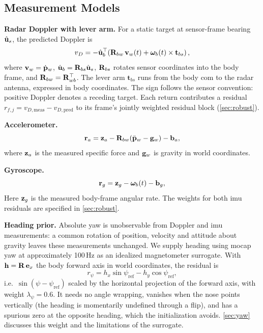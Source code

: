 \subsection{Measurement Models}
\label{sec:models}

\textbf{Radar Doppler with lever arm.}
For a static target at sensor-frame bearing $\hat{\mathbf{u}}_s$, the predicted
Doppler is
\begin{equation}
  v_D = -\hat{\mathbf{u}}_b^{\top}\!\left(
    \mathbf{R}_{bw}\,\mathbf{v}_w(t) + \boldsymbol{\omega}_b(t) \times \mathbf{t}_{bs}
  \right),
  \label{eq:doppler}
\end{equation}
where $\mathbf{v}_w=\dot{\mathbf{p}}_w$, $\hat{\mathbf{u}}_b=\mathbf{R}_{bs}\hat{\mathbf{u}}_s$,
$\mathbf{R}_{bs}$ rotates sensor coordinates into the body frame, and
$\mathbf{R}_{bw}=\mathbf{R}_{wb}^{\top}$.  The lever arm $\mathbf{t}_{bs}$ runs
from the body \ac{com} to the radar antenna, expressed in body coordinates.
The sign follows the sensor convention: positive Doppler denotes a
receding target.  Each return contributes a residual
$r_{f,j}=v_{D,\mathrm{meas}}-v_{D,\mathrm{pred}}$ to its frame's
jointly weighted residual block (\autoref{sec:robust}).

\textbf{Accelerometer.}
\begin{equation}
  \mathbf{r}_a = \mathbf{z}_a - \mathbf{R}_{bw}\!\left(\ddot{\mathbf{p}}_w - \mathbf{g}_w\right) - \mathbf{b}_a,
  \label{eq:accel}
\end{equation}
where $\mathbf{z}_a$ is the measured specific force and $\mathbf{g}_w$ is gravity
in world coordinates.

\textbf{Gyroscope.}
\begin{equation}
  \mathbf{r}_g = \mathbf{z}_g - \boldsymbol{\omega}_b(t) - \mathbf{b}_g,
  \label{eq:gyro}
\end{equation}
Here $\mathbf{z}_g$ is the measured body-frame angular rate.  The weights
for both \ac{imu} residuals are specified in \autoref{sec:robust}.

\textbf{Heading prior.}
Absolute yaw is unobservable from Doppler and \ac{imu} measurements:
a common rotation of position, velocity and attitude about gravity
leaves these measurements unchanged.  We supply heading using
\ac{mocap} yaw at approximately 100\,Hz as an idealized magnetometer
surrogate.  With $\mathbf{h} = \mathbf{R}\,\mathbf{e}_x$ the body forward axis in world
coordinates, the residual is
\begin{equation}
  r_\psi = h_x \sin\psi_{\mathrm{ref}} - h_y \cos\psi_{\mathrm{ref}},
  \label{eq:heading}
\end{equation}
i.e.\ $\sin(\psi-\psi_{\mathrm{ref}})$ scaled by the horizontal
projection of the forward axis, with weight $\lambda_\psi=0.6$.  It
needs no angle wrapping, vanishes when the nose points vertically (the
heading is momentarily undefined through a flip), and has a spurious
zero at the opposite heading, which the initialization avoids.
\autoref{sec:yaw} discusses this weight and the limitations of the surrogate.

